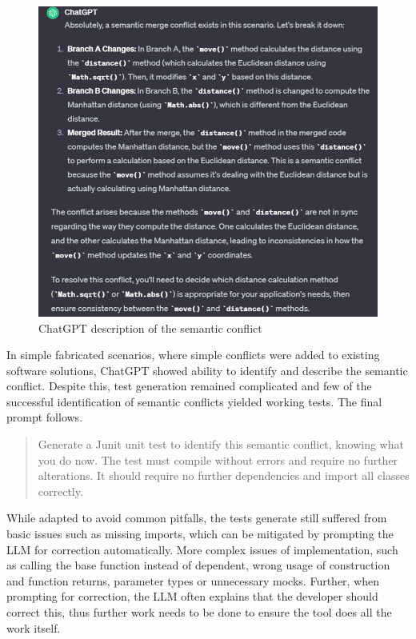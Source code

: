 \begin{figure}
    \centering
    \includegraphics[width=0.75\linewidth]{figures/image.png}
    \caption{ChatGPT description of the semantic conflict}
    \label{fig:semconf}
\end{figure}

In simple fabricated scenarios, where simple conflicts were added to existing software solutions, ChatGPT showed ability to identify and describe the semantic conflict. Despite this, test generation remained complicated and few of the successful identification of semantic conflicts yielded working tests. The final prompt follows.

\begin{quote}
Generate a Junit unit test to identify this semantic conflict, knowing what you do now. The test must compile without errors and require no further alterations. It should require no further dependencies and import all classes correctly.
\end{quote}

While adapted to avoid common pitfalls, the tests generate still suffered from basic issues such as missing imports, which can be mitigated by prompting the LLM for correction automatically. More complex issues of implementation, such as calling the base function instead of dependent, wrong usage of construction and function returns, parameter types or unnecessary mocks. Further, when prompting for correction, the LLM often explains that the developer should correct this, thus further work needs to be done to ensure the tool does all the work itself.

